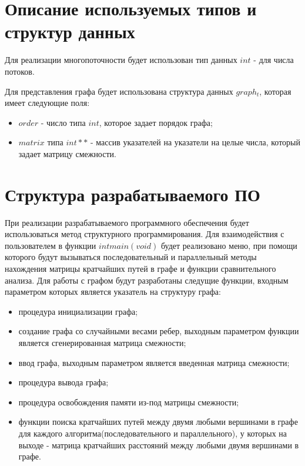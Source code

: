 \section{Описание используемых типов и структур данных}

Для реализации многопоточности будет использован тип данных $int$ - для числа потоков.

Для представления графа будет использована структура данных $graph_t$, которая имеет следующие поля:

\begin{itemize}
	\item $order$ - число типа $int$, которое задает порядок графа;
	\item $matrix$ типа $int **$  - массив указателей на указатели на целые числа, который задает матрицу смежности.
\end{itemize}

\section{Структура разрабатываемого ПО}

При реализации разрабатываемого программного обеспечения будет использоваться метод структурного программирования. Для взаимодействия с пользователем в функции $int main(void)$ будет реализовано меню, при помощи которого будут вызываться последовательный и параллельный методы нахождения матрицы кратчайших путей в графе и функции сравнительного анализа. Для работы с графом будут разработаны следущие функции, входным параметром которых является указатель на структуру графа:

\begin{itemize}
	\item процедура инициализации графа; 
	\item создание графа со случайными весами ребер, выходным параметром функции является сгенерированная матрица смежности;
	\item ввод графа, выходным параметром является введенная матрица смежности;
	\item процедура вывода графа;
	\item процедура освобождения памяти из-под матрицы смежности;
	\item функции поиска кратчайших путей между двумя любыми вершинами в графе для каждого алгоритма(последовательного и параллельного), у которых на выходе - матрица кратчайших расстояний между любыми двумя вершинами в графе. 
\end{itemize}

